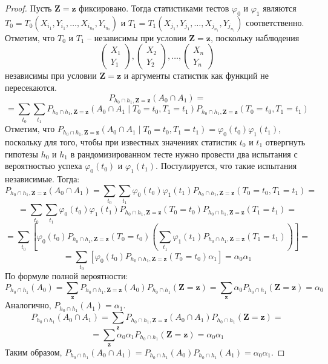 \begin{proof}
    Пусть $\mathbf{Z}=\mathbf{z}$ фиксировано. Тогда
    статистиками тестов $\varphi_0$ и 
    $\varphi_1$ являются $T_0=T_0(X_{i_1},Y_{i_1},\ldots,X_{i_{n_0}},Y_{i_{n_0}})$ и 
    $T_1=T_1(X_{j_1},Y_{j_1},\ldots,X_{j_{n_1}},Y_{j_{n_1}})$ соответственно.
    Отметим, что $T_0$ и $T_1$ -- независимы при условии $\mathbf{Z}=\mathbf{z}$, поскольку
    наблюдения
    $$
    \begin{pmatrix}
        X_1 \\
        Y_1
    \end{pmatrix},
    \begin{pmatrix}
        X_2 \\
        Y_2
    \end{pmatrix}, \ldots,
    \begin{pmatrix}
        X_n \\
        Y_n
    \end{pmatrix}
    $$
    независимы при условии $\mathbf{Z}=\mathbf{z}$
    и аргументы статистик как функций не пересекаются.
    $$
    P_{h_0\cap h_1,\mathbf{Z=z}}(A_0 \cap A_1)=
    $$
    $$
    =\sum_{t_0}\sum_{t_1} P_{h_0\cap h_1,\mathbf{Z=z}}(A_0 \cap A_1 \mid T_0=t_0, T_1=t_1)P_{h_0\cap h_1,\mathbf{Z=z}}(T_0=t_0, T_1=t_1)
    $$
    Отметим, что $P_{h_0\cap h_1,\mathbf{Z=z}}(A_0 \cap A_1 \mid T_0=t_0, T_1=t_1)=\varphi_0(t_0)\varphi_1(t_1)$, поскольку
    для того, чтобы при известных значениях статистик $t_0$ и $t_1$ отвергнуть гипотезы $h_0$ и $h_1$ в рандомизированном тесте нужно провести два испытания с вероятностью успеха
    $\varphi_0(t_0)$ и $\varphi_1(t_1)$. Постулируется, что такие испытания независимые. Тогда:
    $$
    P_{h_0\cap h_1,\mathbf{Z=z}}(A_0 \cap A_1)=\sum_{t_0}\sum_{t_1} \varphi_0(t_0) \varphi_1(t_1) P_{h_0\cap h_1,\mathbf{Z=z}}(T_0=t_0, T_1=t_1)=
    $$
    $$
    =\sum_{t_0}\sum_{t_1} \varphi_0(t_0) \varphi_1(t_1) P_{h_0\cap h_1,\mathbf{Z=z}}(T_0=t_0)P_{h_0\cap h_1,\mathbf{Z=z}}(T_1=t_1)=
    $$
    $$
    =\sum_{t_0}\left[ \varphi_0(t_0) P_{h_0\cap h_1,\mathbf{Z=z}}(T_0=t_0) \left(\sum_{t_1}\varphi_1(t_1) P_{h_0\cap h_1,\mathbf{Z=z}}(T_1=t_1)\right)\right]=
    $$
    $$
    = \sum_{t_0}[ \varphi_0(t_0) P_{h_0\cap h_1,\mathbf{Z=z}}(T_0=t_0) \alpha_1] 
    =\alpha_0 \alpha_1
    $$
    По формуле полной вероятности:
    $$
    P_{h_0\cap h_1}(A_0) = \sum_{\mathbf{z}} P_{h_0\cap h_1,\mathbf{Z=z}}(A_0) P_{h_0\cap h_1}(\mathbf{Z}=\mathbf{z})
    = \sum_{\mathbf{z}} \alpha_0 P_{h_0\cap h_1}(\mathbf{Z}=\mathbf{z})=\alpha_0
    $$
    Аналогично, $P_{h_0\cap h_1}(A_1)=\alpha_1$.
    $$
    P_{h_0\cap h_1}(A_0 \cap A_1) = \sum_{\mathbf{z}} P_{h_0\cap h_1,\mathbf{Z=z}}(A_0 \cap A_1) P_{h_0\cap h_1}(\mathbf{Z}=\mathbf{z})=
    $$
    $$
    = \sum_{\mathbf{z}} \alpha_0 \alpha_1 P_{h_0\cap h_1}(\mathbf{Z}=\mathbf{z})
    = \alpha_0 \alpha_1
    $$
    Таким образом, $P_{h_0\cap h_1}(A_0 \cap A_1)=P_{h_0\cap h_1}(A_0) P_{h_0\cap h_1}(A_1)=\alpha_0 \alpha_1$.
\end{proof}
